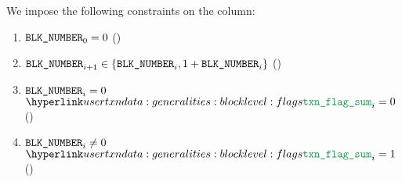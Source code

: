 We impose the following constraints on the \blockNumber{} column:
\begin{enumerate}
	\item $\texttt{BLK\_NUMBER} _{0} = 0$ (\sanityCheck)
	\item $\texttt{BLK\_NUMBER} _{i + 1} \in \{ \texttt{BLK\_NUMBER} _{i}, 1 + \texttt{BLK\_NUMBER} _{i} \}$ (\sanityCheck)
	\item \If $\texttt{BLK\_NUMBER} _{i} =    0$ \Then $\transactionFlagSum _{i} = 0$ (\sanityCheck)
	\item \If $\texttt{BLK\_NUMBER} _{i} \neq 0$ \Then $\transactionFlagSum _{i} = 1$ (\sanityCheck)
\end{enumerate}
